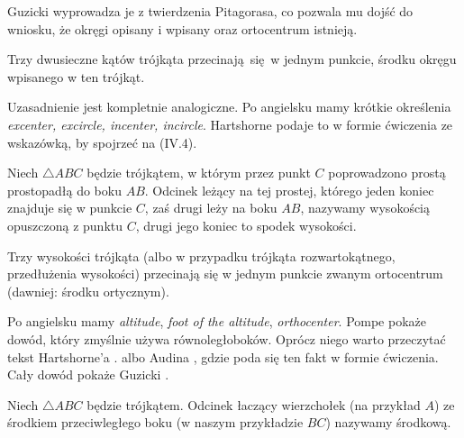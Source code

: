 Guzicki \cite[s. 176]{guzicki_2021} wyprowadza je z twierdzenia Pitagorasa, co pozwala mu dojść do wniosku, że okręgi opisany i wpisany oraz ortocentrum istnieją.

\begin{proposition}
    Trzy dwusieczne kątów trójkąta przecinają się w jednym punkcie, środku okręgu wpisanego w ten trójkąt.
\end{proposition}

Uzasadnienie jest kompletnie analogiczne.
Po angielsku mamy krótkie określenia \emph{excenter, excircle, incenter, incircle}.
Hartshorne \cite[s. 16]{hartshorne2000} podaje to w formie ćwiczenia ze wskazówką, by spojrzeć na (IV.4).

\begin{definition}[wysokość]
%
    Niech $\triangle ABC$ będzie trójkątem, w którym przez punkt $C$ poprowadzono prostą prostopadłą do boku $AB$.
    Odcinek leżący na tej prostej, którego jeden koniec znajduje się w punkcie $C$, zaś drugi leży na boku $AB$, nazywamy wysokością opuszczoną z punktu $C$, drugi jego koniec to spodek wysokości.
\end{definition}


\begin{proposition}
\label{wysokosci_przecinaja_sie}%
	Trzy wysokości trójkąta (albo w przypadku trójkąta rozwartokątnego, przedłużenia wysokości) przecinają się w jednym punkcie zwanym ortocentrum (dawniej: środku ortycznym).
%
\end{proposition}

Po angielsku mamy \emph{altitude}, \emph{foot of the altitude}, \emph{orthocenter}.
Pompe \cite[s. 38]{pompe_2022} pokaże dowód, który zmyślnie używa równoległoboków.
Oprócz niego warto przeczytać tekst Hartshorne'a \cite[s. 54]{hartshorne2000}. albo Audina \cite[s. 61]{audin_2003}, gdzie poda się ten fakt w formie ćwiczenia.
Cały dowód pokaże Guzicki \cite[s. 218]{guzicki_2021}.

\begin{definition}[środkowa]
%
    Niech $\triangle ABC$ będzie trójkątem.
    Odcinek łaczący wierzchołek (na przykład $A$) ze środkiem przeciwległego boku (w naszym przykładzie $BC$) nazywamy środkową.
\end{definition}

